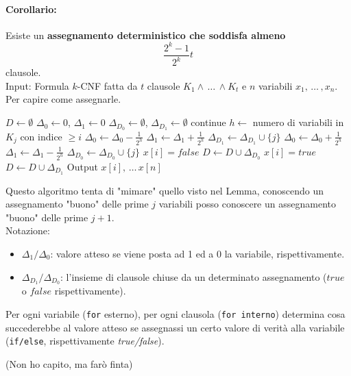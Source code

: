\paragraph{Corollario:} Esiste un \textbf{assegnamento deterministico che soddisfa almeno} 
$$ \frac{2^k - 1}{2^k} t$$
clausole.\\
Input: Formula $k$-CNF fatta da $t$ clausole $K_1 \wedge \, \dots \, \wedge K_t$ e $n$ variabili $x_1, \, \dots \, , x_n$.\\
Per capire come assegnarle.\\
\begin{algorithmic}
	\STATE $D \leftarrow \emptyset$
		\STATE $\Delta_0 \leftarrow 0$, $\Delta_1 \leftarrow 0$
		\STATE $\Delta_{D_0} \leftarrow \emptyset$, $\Delta_{D_1} \leftarrow \emptyset$
				\STATE continue
			\ENDIF
			\STATE $h \leftarrow$ numero di variabili in $K_j$ con indice $\geq i$
				\STATE $\Delta_0 \leftarrow \Delta_0 - \frac{1}{2^h}$
				\STATE $\Delta_1 \leftarrow \Delta_1 + \frac{1}{2^h}$
				\STATE $\Delta_{D_1} \leftarrow \Delta_{D_1} \cup \{j\}$
			\ELSE
				\STATE $\Delta_0 \leftarrow \Delta_0 + \frac{1}{2^h}$
				\STATE $\Delta_1 \leftarrow \Delta_1 - \frac{1}{2^h}$
				\STATE $\Delta_{D_0} \leftarrow \Delta_{D_0} \cup \{j\}$
			\ENDIF
		\ENDFOR
			\STATE $x[i] = false$
			\STATE $D \leftarrow D \cup \Delta_{D_0}$
		\ELSE
			\STATE $x[i] = true$
			\STATE $D \leftarrow D \cup \Delta_{D_1}$
		\ENDIF
	\ENDFOR
	\STATE Output $x[i], \, \dots \, x[n]$
\end{algorithmic}

\newpage

Questo algoritmo tenta di "mimare" quello visto nel Lemma, conoscendo un assegnamento "buono" delle prime $j$ variabili posso conoscere un assegnamento "buono" delle prime $j+1$.\\

Notazione:
\begin{itemize}
	\item $\Delta_1/\Delta_0$: valore atteso se viene posta ad 1 ed a 0 la variabile, rispettivamente.\\
	
	\item $\Delta_{D_1}/\Delta_{D_0}$: l'insieme di clausole chiuse da un determinato assegnamento ($true$ o $false$ rispettivamente).\\
\end{itemize}

Per ogni variabile (\texttt{for} esterno), per ogni clausola (\texttt{for interno}) determina cosa succederebbe al valore atteso se assegnassi un certo valore di verità alla variabile (\texttt{if/else}, rispettivamente \textit{true/false}).\\

\vfill

(Non ho capito, ma farò finta)

\newpage

